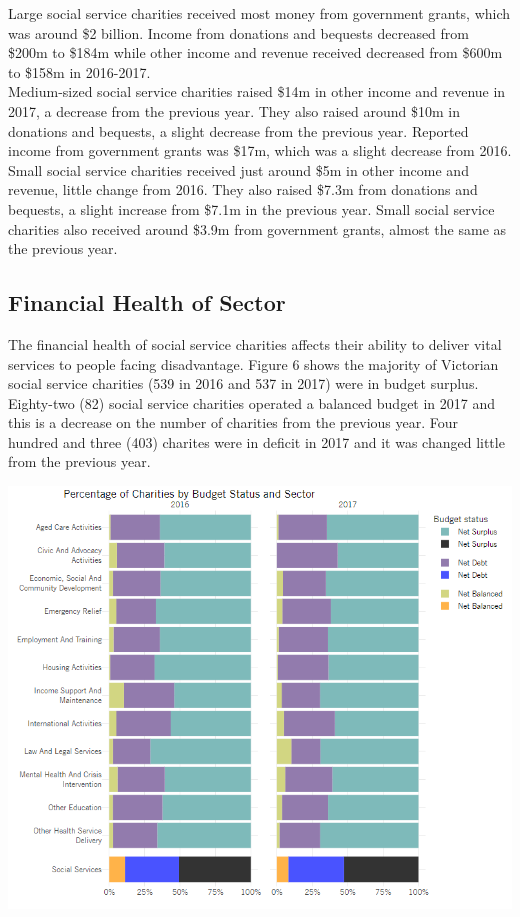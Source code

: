 \documentclass[
  11pt,
]{article}
\let\origfigure\figure
\let\endorigfigure\endfigure
\renewenvironment{figure}[1][2] {
    \expandafter\origfigure\expandafter[H]
} {
    \endorigfigure
}
\begin{document}
Large social service charities received most money from government grants, which was around \$2 billion. Income from donations and bequests decreased from \$200m to \$184m while other income and revenue received decreased from \$600m to \$158m in 2016-2017.\\
Medium-sized social service charities raised \$14m in other income and revenue in 2017, a decrease from the previous year. They also raised around \$10m in donations and bequests, a slight decrease from the previous year. Reported income from government grants was \$17m, which was a slight decrease from 2016.\\
Small social service charities received just around \$5m in other income and revenue, little change from 2016. They also raised \$7.3m from donations and bequests, a slight increase from \$7.1m in the previous year. Small social service charities also received around \$3.9m from government grants, almost the same as the previous year.
\newpage

\hypertarget{financial-health-of-sector}{%
\subsection{Financial Health of Sector}\label{financial-health-of-sector}}

The financial health of social service charities affects their ability to deliver vital services to people facing disadvantage. Figure 6 shows the majority of Victorian social service charities (539 in 2016 and 537 in 2017) were in budget surplus. Eighty-two (82) social service charities operated a balanced budget in 2017 and this is a decrease on the number of charities from the previous year. Four hundred and three (403) charites were in deficit in 2017 and it was changed little from the previous year.

\begin{figure}
\centering
\includegraphics{Fig6 Budget Status props.PNG}
\caption{Budget status per Main Activity}
\end{figure}
\end{document}
